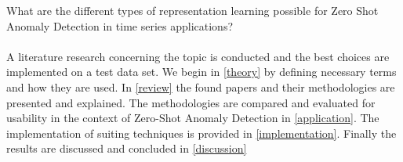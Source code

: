 What are the different types of representation learning possible for Zero Shot Anomaly Detection in time series applications?\\\\
A literature research concerning the topic is conducted and the best choices are implemented on a test data set. We begin in \ref{theory} by defining necessary terms and how they are used. In \ref{review} the found papers and their methodologies are presented and explained. The methodologies are compared and evaluated for usability in the context of Zero-Shot Anomaly Detection in \ref{application}. The implementation of suiting techniques is provided in \ref{implementation}. Finally the results are discussed and concluded in \ref{discussion}
